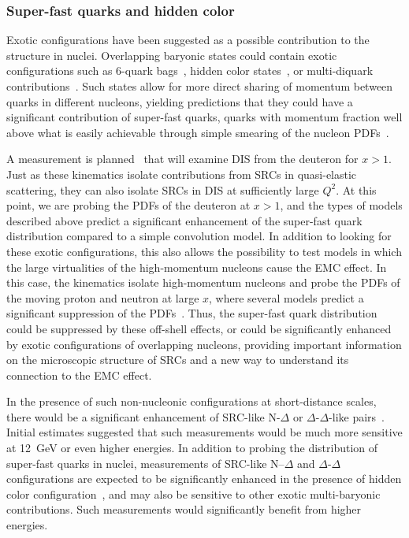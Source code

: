 \subsubsection{Super-fast quarks and hidden color}

Exotic configurations have been suggested as a possible contribution to the structure in nuclei.  Overlapping baryonic states could contain exotic configurations such as 6-quark bags~\cite{Bickerstaff:1984gut}, hidden color states~\cite{Brodsky:1995rn, Brodsky:2004tq, Brodsky:2004zw}, or multi-diquark contributions~\cite{West:2020rlk}. Such states allow for more direct sharing of momentum between quarks in different nucleons, yielding predictions that they could have a significant contribution of super-fast quarks, quarks with momentum fraction well above what is easily achievable through simple smearing of the nucleon PDFs~\cite{Sargsian:2002wc,Freese:2014zda}. 

A measurement is planned~\cite{E12-06-105} that will examine DIS from the deuteron for $x>1$. Just as these kinematics isolate contributions from SRCs in quasi-elastic scattering, they can also isolate SRCs in DIS at sufficiently large $Q^2$. At this point, we are probing the PDFs of the deuteron at $x>1$, and the types of models described above predict a significant enhancement of the super-fast quark distribution compared to a simple convolution model.  In addition to looking for these exotic configurations, this also allows the possibility to test models in which the large virtualities of the high-momentum nucleons cause the EMC effect. In this case, the kinematics isolate high-momentum nucleons and probe the PDFs of the moving proton and neutron at large $x$, where several models predict a significant suppression of the PDFs~\cite{Melnitchouk:1993nk, Melnitchouk:1996vp, Hen:2016kwk}. Thus, the super-fast quark distribution could be suppressed by these off-shell effects, or could be significantly enhanced by exotic configurations of overlapping nucleons, providing important information on the microscopic structure of SRCs and a new way to understand its connection to the EMC effect.

In the presence of such non-nucleonic configurations at short-distance scales, there would be a significant enhancement of SRC-like N-$\Delta$ or $\Delta$-$\Delta$-like pairs~\cite{Ji:1985ky}. Initial estimates  suggested that such measurements would be much more sensitive at 12~GeV or even higher energies. In addition to probing the distribution of super-fast quarks in nuclei, measurements of SRC-like N--$\Delta$ and $\Delta$-$\Delta$ configurations are expected to be significantly enhanced in the presence of hidden color configuration~\cite{Ji:1985ky}, and may also be sensitive to other exotic multi-baryonic contributions. Such measurements would significantly benefit from higher energies.



